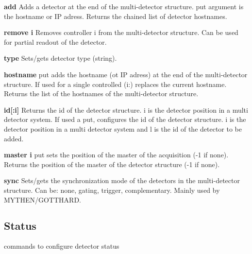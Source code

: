 \begin{DoxyItemize}
\item {\bfseries add} Adds a detector at the end of the multi-\/detector structure. {\ttfamily put} argument is the hostname or IP adress. Returns the chained list of detector hostnames.
\end{DoxyItemize}


\begin{DoxyItemize}
\item {\bfseries remove i} Removes controller {\ttfamily i} from the multi-\/detector structure. Can be used for partial readout of the detector.
\end{DoxyItemize}


\begin{DoxyItemize}
\item {\bfseries type} Sets/gets detector type (string).
\end{DoxyItemize}


\begin{DoxyItemize}
\item {\bfseries hostname} {\ttfamily put} adds the hostname (ot IP adress) at the end of the multi-\/detector structure. If used for a single controlled (i:) replaces the current hostname. Returns the list of the hostnames of the multi-\/detector structure.
\end{DoxyItemize}


\begin{DoxyItemize}
\item {\bfseries id\mbox{[}:i\mbox{]}} Returns the id of the detector structure. i is the detector position in a multi detector system. If used a {\ttfamily put}, configures the id of the detector structure. i is the detector position in a multi detector system and l is the id of the detector to be added.
\end{DoxyItemize}


\begin{DoxyItemize}
\item {\bfseries master i} {\ttfamily put} sets the position of the master of the acquisition (-\/1 if none). Returns the position of the master of the detector structure (-\/1 if none).
\end{DoxyItemize}


\begin{DoxyItemize}
\item {\bfseries sync} Sets/gets the synchronization mode of the detectors in the multi-\/detector structure. Can be: {\ttfamily none}, {\ttfamily gating}, {\ttfamily trigger}, {\ttfamily complementary}. Mainly used by MYTHEN/GOTTHARD.
\end{DoxyItemize}\hypertarget{config_configstatus}{}\subsection{Status}\label{config_configstatus}
commands to configure detector status


